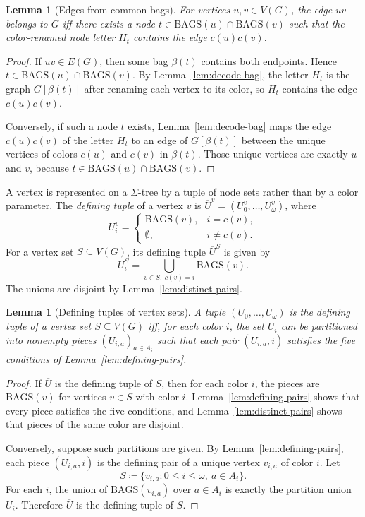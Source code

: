 \documentclass[11pt]{article}
\newtheorem{lemma}[theorem]{Lemma}
\theoremstyle{definition}
\newcommand{\defeq}{\coloneqq}
\newcommand{\Bags}{\mathrm{BAGS}}
\newcommand{\tuple}[1]{\overline{#1}}
\begin{document}
\begin{lemma}[Edges from common bags]\label{lem:edges-bags}
For vertices \(u,v\in V(G)\), the edge \(uv\) belongs to \(G\) iff there exists a
node \(t\in\Bags(u)\cap\Bags(v)\) such that the color-renamed node letter \(H_t\)
contains the edge \(c(u)c(v)\).
\end{lemma}

\begin{proof}
If \(uv\in E(G)\), then some bag \(\beta(t)\) contains both endpoints.  Hence
\(t\in\Bags(u)\cap\Bags(v)\).  By Lemma~\ref{lem:decode-bag}, the letter \(H_t\)
is the graph \(G[\beta(t)]\) after renaming each vertex to its color, so \(H_t\)
contains the edge \(c(u)c(v)\).

Conversely, if such a node \(t\) exists, Lemma~\ref{lem:decode-bag} maps the edge
\(c(u)c(v)\) of the letter \(H_t\) to an edge of \(G[\beta(t)]\) between the unique
vertices of colors \(c(u)\) and \(c(v)\) in \(\beta(t)\).  Those unique vertices
are exactly \(u\) and \(v\), because \(t\in\Bags(u)\cap\Bags(v)\).
\end{proof}

A vertex is represented on a \(\Sigma\)-tree by a tuple of node sets rather than
by a color parameter.  The \emph{defining tuple} of a vertex \(v\) is
\(\tuple U^v=(U^v_0,\ldots,U^v_\omega)\), where
\[
  U^v_i =
  \begin{cases}
    \Bags(v), & i=c(v),\\
    \emptyset, & i\ne c(v).
  \end{cases}
\]
For a vertex set \(S\subseteq V(G)\), its defining tuple \(\tuple U^S\) is given by
\[
  U^S_i = \bigcup_{v\in S,\ c(v)=i}\Bags(v).
\]
The unions are disjoint by Lemma~\ref{lem:distinct-pairs}.

\begin{lemma}[Defining tuples of vertex sets]\label{lem:defining-tuples}
A tuple \((U_0,\ldots,U_\omega)\) is the defining tuple of a vertex set \(S\subseteq V(G)\) iff,
for each color \(i\), the set \(U_i\) can be partitioned into nonempty pieces
\((U_{i,a})_{a\in A_i}\) such that each pair \((U_{i,a},i)\) satisfies the five
conditions of Lemma~\ref{lem:defining-pairs}.
\end{lemma}

\begin{proof}
If \(\tuple U\) is the defining tuple of \(S\), then for each color \(i\), the
pieces are \(\Bags(v)\) for vertices \(v\in S\) with color \(i\).  Lemma~\ref{lem:defining-pairs} shows
that every piece satisfies the five conditions, and Lemma~\ref{lem:distinct-pairs} shows that pieces of
the same color are disjoint.

Conversely, suppose such partitions are given.  By Lemma~\ref{lem:defining-pairs}, each piece
\((U_{i,a},i)\) is the defining pair of a unique vertex \(v_{i,a}\) of color
\(i\).  Let
\[
  S\defeq\{v_{i,a}:0\le i\le\omega,\ a\in A_i\}.
\]
For each \(i\), the union of \(\Bags(v_{i,a})\) over \(a\in A_i\) is exactly the partition union \(U_i\).  Therefore
\(\tuple U\) is the defining tuple of \(S\).
\end{proof}
\end{document}
